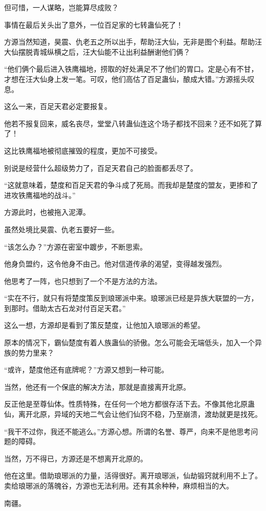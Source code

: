 \begin{this_body}
但可惜，一人谋略，岂能算尽成败？

事情在最后关头出了意外，一位百足家的七转蛊仙死了！

方源当然知道，昊震、仇老五之所以出手，帮助汪大仙，无非是图个利益。帮助汪大仙摆脱青城纵横之后，汪大仙能不让出利益酬谢他们俩？

“他们俩个最后进入铁鹰福地，捞取的好处满足不了他们的胃口。定是心有不甘，才想在汪大仙身上发一笔。可叹，他们高估了百足蛊仙，酿成大错。”方源摇头叹息。

这么一来，百足天君必定要报复。

他若不报复回来，威名丧尽，堂堂八转蛊仙连这个场子都找不回来？还不如死了算了！

这比铁鹰福地被彻底摧毁的程度，更加不可接受。

别说是经营什么超级势力了，百足天君自己的脸面都丢尽了。

“这就意味着，楚度和百足天君的争斗成了死局。而我却是楚度的盟友，更掺和了进攻铁鹰福地的战斗。”

方源此时，也被拖入泥潭。

虽然处境比昊震、仇老五要好一些。

“该怎么办？”方源在密室中踱步，不断思索。

他身负盟约，这令他身不由己。他对信道传承的渴望，变得越发强烈。

他思考了一阵，也只想到了一个不是方法的方法。

“实在不行，就只有将楚度策反到琅琊派中来。琅琊派已经是异族大联盟的一方，到那时。借助太古石龙对付百足天君。”

这么一想，方源却是看到了策反楚度，让他加入琅琊派的希望。

原本的情况下，霸仙楚度有着人族蛊仙的骄傲。怎么可能会无端低头，加入一个异族的势力里来？

“或许，楚度他还有底牌呢？”方源又想到一种可能。

当然，他还有一个保底的解决方法，那就是直接离开北原。

反正他是至尊仙体。性质特殊，在任何一个地方都很存活下去。不像其他北原蛊仙，离开北原，异域的天地二气会让他们仙窍不稳，乃至崩溃，渡劫就更是找死。

“我干不过你，我还不能逃么。”方源心想。所谓的名誉、尊严，向来不是他思考问题的障碍。

当然，万不得已，方源还是不想离开北原的。

他在这里。借助琅琊派的力量，活得很好。离开琅琊派，仙劫锻窍就利用不上了。卖给琅琊派的落魄谷，方源也无法利用。还有其余种种，麻烦相当的大。

南疆。


\end{this_body}
